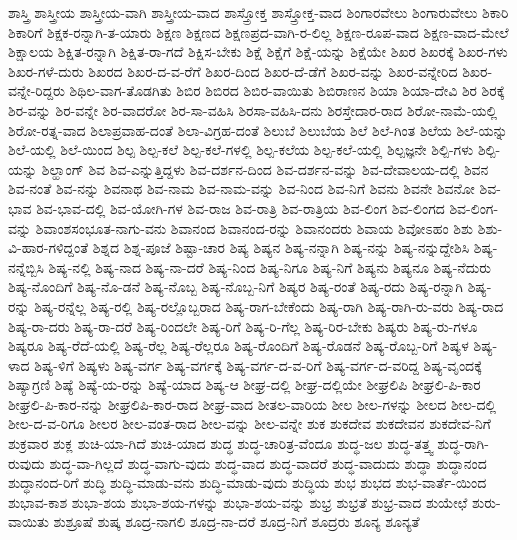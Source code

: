 {ಶಾಸ್ತ್ರಿ
ಶಾಸ್ತ್ರೀಯ
ಶಾಸ್ತ್ರೀಯ-ವಾಗಿ
ಶಾಸ್ತ್ರೀಯ-ವಾದ
ಶಾಸ್ತ್ರೋಕ್ತ
ಶಾಸ್ತ್ರೋಕ್ತ-ವಾದ
ಶಿಂಗಾರವೇಲು
ಶಿಂಗಾರುವೇಲು
ಶಿಕಾರಿ
ಶಿಕಾರಿಗೆ
ಶಿಕ್ಷಕ-ರನ್ನಾಗಿ-ತ-ಯಾರು
ಶಿಕ್ಷಣ
ಶಿಕ್ಷಣದ
ಶಿಕ್ಷಣಪ್ರದ-ವಾಗಿ-ರ-ಲಿಲ್ಲ
ಶಿಕ್ಷಣ-ರೂಪ-ವಾದ
ಶಿಕ್ಷಣ-ವಾದ-ಮೇಲೆ
ಶಿಕ್ಷಾಲಯ
ಶಿಕ್ಷಿತ-ರನ್ನಾಗಿ
ಶಿಕ್ಷಿತ-ರಾ-ಗದೆ
ಶಿಕ್ಷಿಸ-ಬೇಕು
ಶಿಕ್ಷೆ
ಶಿಕ್ಷೆಗೆ
ಶಿಕ್ಷೆ-ಯನ್ನು
ಶಿಕ್ಷೆಯೇ
ಶಿಖರ
ಶಿಖರಕ್ಕೆ
ಶಿಖರ-ಗಳು
ಶಿಖರ-ಗಳೆ-ದುರು
ಶಿಖರದ
ಶಿಖರ-ದ-ವ-ರೆಗೆ
ಶಿಖರ-ದಿಂದ
ಶಿಖರ-ದೆ-ಡೆಗೆ
ಶಿಖರ-ವನ್ನು
ಶಿಖರ-ವನ್ನೇರಿದ
ಶಿಖರ-ವನ್ನೇ-ರಿದ್ದರು
ಶಿಥಿಲ-ವಾಗ-ತೊಡಗಿತು
ಶಿಬಿರ
ಶಿಬಿರದ
ಶಿಬಿರ-ವಾಯಿತು
ಶಿಬಿರಾಣನ
ಶಿಯಾ
ಶಿಯಾ-ದೇವಿ
ಶಿರ
ಶಿರಕ್ಕೆ
ಶಿರ-ವನ್ನು
ಶಿರ-ವನ್ನೇ
ಶಿರ-ವಾದರೋ
ಶಿರ-ಸಾ-ವಹಿಸಿ
ಶಿರಸಾ-ವಹಿಸಿ-ದನು
ಶಿರಸ್ತೇದಾರ-ರಾದ
ಶಿರೋ-ನಾಮೆ-ಯಲ್ಲಿ
ಶಿರೋ-ರತ್ನ-ವಾದ
ಶಿಲಾಪ್ರವಾಹ-ದಂತೆ
ಶಿಲಾ-ವಿಗ್ರಹ-ದಂತೆ
ಶಿಲುಬೆ
ಶಿಲುಬೆಯ
ಶಿಲೆ
ಶಿಲೆ-ಗಿಂತ
ಶಿಲೆಯ
ಶಿಲೆ-ಯನ್ನು
ಶಿಲೆ-ಯಲ್ಲಿ
ಶಿಲೆ-ಯಿಂದ
ಶಿಲ್ಪ
ಶಿಲ್ಪ-ಕಲೆ
ಶಿಲ್ಪ-ಕಲೆ-ಗಳಲ್ಲಿ
ಶಿಲ್ಪ-ಕಲೆಯ
ಶಿಲ್ಪ-ಕಲೆ-ಯಲ್ಲಿ
ಶಿಲ್ಪಜ್ಞನೇ
ಶಿಲ್ಪಿ-ಗಳು
ಶಿಲ್ಪಿ-ಯನ್ನು
ಶಿಲ್ಹಾಂಗ್
ಶಿವ
ಶಿವ-ಎನ್ನುತ್ತಿದ್ದಳು
ಶಿವ-ದರ್ಶನ-ದಿಂದ
ಶಿವ-ದರ್ಶನ-ವನ್ನು
ಶಿವ-ದೇವಾಲಯ-ದಲ್ಲಿ
ಶಿವನ
ಶಿವ-ನಂತೆ
ಶಿವ-ನನ್ನು
ಶಿವನಾಥ
ಶಿವ-ನಾಮ
ಶಿವ-ನಾಮ-ವನ್ನು
ಶಿವ-ನಿಂದ
ಶಿವ-ನಿಗೆ
ಶಿವನು
ಶಿವನೇ
ಶಿವನೋ
ಶಿವ-ಭಾವ
ಶಿವ-ಭಾವ-ದಲ್ಲಿ
ಶಿವ-ಯೋಗಿ-ಗಳ
ಶಿವ-ರಾಜ
ಶಿವ-ರಾತ್ರಿ
ಶಿವ-ರಾತ್ರಿಯ
ಶಿವ-ಲಿಂಗ
ಶಿವ-ಲಿಂಗದ
ಶಿವ-ಲಿಂಗ-ವನ್ನು
ಶಿವಾಂಶಸಂಭೂತ-ನಾಗು-ವನು
ಶಿವಾನಂದ
ಶಿವಾನಂದ-ರನ್ನು
ಶಿವಾನಂದರು
ಶಿವಾಯ
ಶಿವೋಽಹಂ
ಶಿಶು
ಶಿಶು-ವಿ-ಹಾರ-ಗಳಿದ್ದಂತೆ
ಶಿಶ್ನದ
ಶಿಶ್ನ-ಪೂಜೆ
ಶಿಷ್ಟಾ-ಚಾರ
ಶಿಷ್ಯ
ಶಿಷ್ಯನ
ಶಿಷ್ಯ-ನನ್ನಾಗಿ
ಶಿಷ್ಯ-ನನ್ನು
ಶಿಷ್ಯ-ನನ್ನುದ್ದೇಶಿಸಿ
ಶಿಷ್ಯ-ನನ್ನೆಬ್ಬಿಸಿ
ಶಿಷ್ಯ-ನಲ್ಲಿ
ಶಿಷ್ಯ-ನಾದ
ಶಿಷ್ಯ-ನಾ-ದರೆ
ಶಿಷ್ಯ-ನಿಂದ
ಶಿಷ್ಯ-ನಿಗೂ
ಶಿಷ್ಯ-ನಿಗೆ
ಶಿಷ್ಯನು
ಶಿಷ್ಯನೂ
ಶಿಷ್ಯ-ನೆದುರು
ಶಿಷ್ಯ-ನೊಂದಿಗೆ
ಶಿಷ್ಯ-ನೊ-ಡನೆ
ಶಿಷ್ಯ-ನೊಬ್ಬ
ಶಿಷ್ಯ-ನೊಬ್ಬ-ನಿಗೆ
ಶಿಷ್ಯರ
ಶಿಷ್ಯ-ರಂತೆ
ಶಿಷ್ಯ-ರದು
ಶಿಷ್ಯ-ರನ್ನಾಗಿ
ಶಿಷ್ಯ-ರನ್ನು
ಶಿಷ್ಯ-ರನ್ನೆಲ್ಲ
ಶಿಷ್ಯ-ರಲ್ಲಿ
ಶಿಷ್ಯ-ರಲ್ಲೊಬ್ಬರಾದ
ಶಿಷ್ಯ-ರಾಗ-ಬೇಕೆಂದು
ಶಿಷ್ಯ-ರಾಗಿ
ಶಿಷ್ಯ-ರಾಗಿ-ರು-ವರು
ಶಿಷ್ಯ-ರಾದ
ಶಿಷ್ಯ-ರಾ-ದರು
ಶಿಷ್ಯ-ರಾ-ದರೆ
ಶಿಷ್ಯ-ರಿಂದಲೇ
ಶಿಷ್ಯ-ರಿಗೆ
ಶಿಷ್ಯ-ರಿ-ಗೆಲ್ಲ
ಶಿಷ್ಯ-ರಿರ-ಬೇಕು
ಶಿಷ್ಯರು
ಶಿಷ್ಯ-ರು-ಗಳೂ
ಶಿಷ್ಯರೂ
ಶಿಷ್ಯ-ರೆದೆ-ಯಲ್ಲಿ
ಶಿಷ್ಯ-ರೆಲ್ಲ
ಶಿಷ್ಯ-ರೆಲ್ಲರೂ
ಶಿಷ್ಯ-ರೊಂದಿಗೆ
ಶಿಷ್ಯ-ರೊಡನೆ
ಶಿಷ್ಯ-ರೊಬ್ಬ-ರಿಗೆ
ಶಿಷ್ಯಳ
ಶಿಷ್ಯ-ಳಾದ
ಶಿಷ್ಯ-ಳಿಗೆ
ಶಿಷ್ಯಳು
ಶಿಷ್ಯ-ವರ್ಗ
ಶಿಷ್ಯ-ವರ್ಗಕ್ಕೆ
ಶಿಷ್ಯ-ವರ್ಗ-ದ-ವ-ರಿಗೆ
ಶಿಷ್ಯ-ವರ್ಗ-ದ-ವರಿದ್ದ
ಶಿಷ್ಯ-ವೃಂದಕ್ಕೆ
ಶಿಷ್ಯಾಗ್ರಣಿ
ಶಿಷ್ಯೆ
ಶಿಷ್ಯೆ-ಯ-ರನ್ನು
ಶಿಷ್ಯೆ-ಯಾದ
ಶಿಷ್ಯ-ಆ
ಶೀಘ್ರ-ದಲ್ಲಿ
ಶೀಘ್ರ-ದಲ್ಲಿಯೇ
ಶೀಘ್ರಲಿಪಿ
ಶೀಘ್ರಲಿ-ಪಿ-ಕಾರ
ಶೀಘ್ರಲಿ-ಪಿ-ಕಾರ-ನನ್ನು
ಶೀಘ್ರಲಿಪಿ-ಕಾರ-ರಾದ
ಶೀಘ್ರ-ವಾದ
ಶೀತಲ-ವಾರಿಯ
ಶೀಲ
ಶೀಲ-ಗಳನ್ನು
ಶೀಲದ
ಶೀಲ-ದಲ್ಲಿ
ಶೀಲ-ದ-ವ-ರಿಗೂ
ಶೀಲರ
ಶೀಲ-ವಂತ-ರಾದ
ಶೀಲ-ವನ್ನು
ಶೀಲ-ವನ್ನೇ
ಶುಕ
ಶುಕದೇವ
ಶುಕದೇವನ
ಶುಕದೇವ-ನಿಗೆ
ಶುಕ್ರವಾರ
ಶುಕ್ಲ
ಶುಚಿ-ಯಾ-ಗಿದೆ
ಶುಚಿ-ಯಾದ
ಶುದ್ಧ
ಶುದ್ಧ-ಚಾರಿತ್ರ-ವೆಂದೂ
ಶುದ್ಧ-ಜಲ
ಶುದ್ಧ-ತತ್ತ್ವ
ಶುದ್ಧ-ರಾಗಿ-ರುವುದು
ಶುದ್ಧ-ವಾ-ಗಿಲ್ಲದೆ
ಶುದ್ಧ-ವಾಗು-ವುದು
ಶುದ್ಧ-ವಾದ
ಶುದ್ಧ-ವಾದರೆ
ಶುದ್ಧ-ವಾದುದು
ಶುದ್ಧಾ
ಶುದ್ಧಾನಂದ
ಶುದ್ಧಾನಂದ-ರಿಗೆ
ಶುದ್ಧಿ
ಶುದ್ಧಿ-ಮಾಡು-ವನು
ಶುದ್ಧಿ-ಮಾಡು-ವುದು
ಶುದ್ಧಿಯ
ಶುಭ
ಶುಭದ
ಶುಭ-ವಾರ್ತೆ-ಯಿಂದ
ಶುಭಾವ-ಕಾಶ
ಶುಭಾ-ಶಯ
ಶುಭಾ-ಶಯ-ಗಳನ್ನು
ಶುಭಾ-ಶಯ-ವನ್ನು
ಶುಭ್ರ
ಶುಭ್ರತೆ
ಶುಭ್ರ-ವಾದ
ಶುಯೇಛೆ
ಶುರು-ವಾಯಿತು
ಶುಶ್ರೂಷೆ
ಶುಷ್ಕ
ಶೂದ್ರ-ನಾಗಲಿ
ಶೂದ್ರ-ನಾ-ದರೆ
ಶೂದ್ರ-ನಿಗೆ
ಶೂದ್ರರು
ಶೂನ್ಯ
ಶೂನ್ಯತೆ
}
